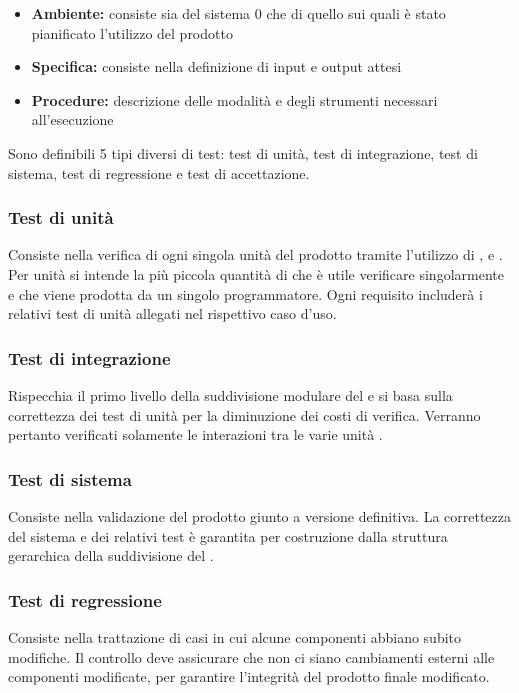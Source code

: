\documentclass[12pt,a4paper]{article}
\begin{document}
\begin{itemize}
	\item \textbf{Ambiente:} consiste sia del sistema  0 che di quello  sui quali è stato pianificato l'utilizzo del prodotto
	\item \textbf{Specifica:} consiste nella definizione di input e output attesi
	\item \textbf{Procedure:} descrizione delle modalità e degli strumenti necessari all'esecuzione
\end{itemize}

Sono definibili 5 tipi diversi di test: test di unità, test di integrazione, test di sistema, test di regressione e test di accettazione.

\subsubsection{Test di unità}
Consiste nella verifica di ogni singola unità del prodotto  tramite l'utilizzo di ,  e . Per unità si intende la più piccola quantità di  che è utile verificare singolarmente e che viene prodotta da un singolo programmatore. Ogni requisito includerà i relativi test di unità allegati nel rispettivo caso d'uso.

\subsubsection{Test di integrazione}
Rispecchia il primo livello della suddivisione modulare del  e si basa sulla correttezza dei test di unità per la diminuzione dei costi di verifica. Verranno pertanto verificati solamente le interazioni tra le varie unità .

\subsubsection{Test di sistema}
Consiste nella validazione del prodotto giunto a versione definitiva. La correttezza del sistema e dei relativi test è garantita per costruzione dalla struttura gerarchica della suddivisione del .

\subsubsection{Test di regressione}
Consiste nella trattazione di casi in cui alcune componenti abbiano subito modifiche. Il controllo deve assicurare che non ci siano cambiamenti esterni alle componenti modificate, per garantire l'integrità del prodotto finale modificato.
\end{document}
